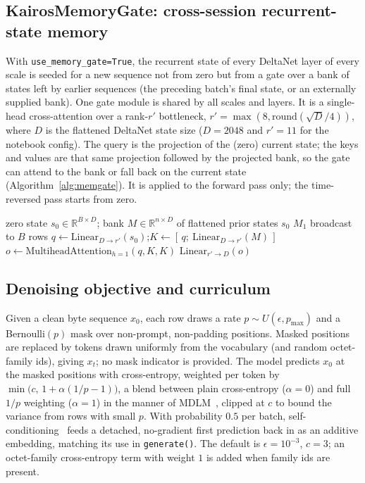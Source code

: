\documentclass[11pt]{article}
\begin{document}
\subsection{KairosMemoryGate: cross-session recurrent-state memory}
\label{sec:memgate}

With \texttt{use\_memory\_gate=True}, the recurrent state of every DeltaNet
layer of every scale is seeded for a new sequence not from zero but from a
gate over a bank of states left by earlier sequences (the preceding batch's
final state, or an externally supplied bank). One gate module is shared by all
scales and layers. It is a single-head cross-attention over a rank-$r'$
bottleneck, $r'=\max(8,\text{round}(\sqrt{D}/4))$, where $D$ is the flattened
DeltaNet state size ($D=2048$ and $r'=11$ for the notebook config). The query is the
projection of the (zero) current state; the keys and values are that same
projection followed by the projected bank, so the gate can attend to the
bank or fall back on the current state (Algorithm~\ref{alg:memgate}). It is
applied to the forward pass only; the time-reversed pass starts from zero.

\begin{algorithm}[t]
\caption{Memory gate, applied per (scale, DeltaNet layer)}
\label{alg:memgate}
\begin{algorithmic}[1]
\Require zero state $s_0\in\mathbb{R}^{B\times D}$; bank $M\in\mathbb{R}^{n\times D}$ of flattened prior states
 \State \Return $s_0$ \EndIf
{} \State \Return $M_1$ broadcast to $B$ rows \EndIf
\State $q\gets\text{Linear}_{D\to r'}(s_0)$;\quad $K\gets[\,q;\ \text{Linear}_{D\to r'}(M)\,]$
\State $o\gets\text{MultiheadAttention}_{h=1}(q,K,K)$
\State \Return $\text{Linear}_{r'\to D}(o)$
\end{algorithmic}
\end{algorithm}

\subsection{Denoising objective and curriculum}
\label{sec:objective}

Given a clean byte sequence $x_0$, each row draws a rate
$p\sim U(\epsilon,p_{\max})$ and a Bernoulli$(p)$ mask over non-prompt,
non-padding positions. Masked positions are replaced by tokens drawn
uniformly from the vocabulary (and random octet-family ids), giving $x_t$; no
mask indicator is provided. The model predicts $x_0$ at the masked positions
with cross-entropy, weighted per token by $\min\!\big(c,\,1+\alpha(1/p-1)\big)$,
a blend between plain cross-entropy ($\alpha=0$) and full $1/p$ weighting
($\alpha=1$) in the manner of MDLM~\citep{sahoo2024mdlm}, clipped at $c$ to
bound the variance from rows with small $p$. With probability $0.5$ per batch,
self-conditioning~\citep{chen2022analogbits} feeds a detached, no-gradient
first prediction back in as an additive embedding, matching its use in
\texttt{generate()}. The default is $\epsilon=10^{-3}$, $c=3$; an
octet-family cross-entropy term with weight $1$ is added when family ids are
present.
\end{document}

